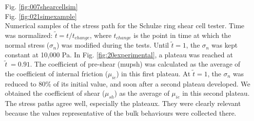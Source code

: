 Fig. \ref{fig:007shearcellsim} \\


Fig. \ref{fig:021simexample} \\


Numerical samples of the stress path
    for the Schulze ring shear cell tester.
	Time was normalized: $\tilde{t} = t/t_{change}$, where $t_{change}$ is the
	point in time at which the normal stress ($\sigma_n$) was modified during the
	tests.
	Until $\tilde{t}=1$, the $\sigma_n$ was kept constant at 10,000 Pa.
	In Fig. \ref{fig:20experimental},
 	a plateau was reached at $\tilde{t}~=0.91$.
	The coefficient of pre-shear (\ac{mupsh}) was calculated as the average of the
	coefficient of internal friction ($\mu_{ie}$) in this first plateau.
	At $\tilde{t}=1$, the $\sigma_n$ was reduced to $80 \%$ of its initial
	value, and soon after
	a second plateau developed.
	We obtained the coefficient of
	shear ($ \mu_{sh}$) as the average of $\mu_{ie}$ in this second plateau.
	The stress paths agree well, especially the plateaux.
	They were clearly relevant because
	the values representative of the bulk behaviours
	were collected there.